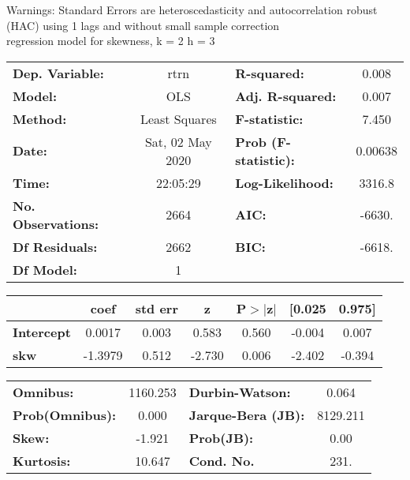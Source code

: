 Warnings: \newline
 [1] Standard Errors are heteroscedasticity and autocorrelation robust (HAC) using 1 lags and without small sample correction\\ 

regression model for skewness, k = 2 h = 3\begin{center}
\begin{tabular}{lclc}
\toprule
\textbf{Dep. Variable:}    &       rtrn       & \textbf{  R-squared:         } &     0.008   \\
\textbf{Model:}            &       OLS        & \textbf{  Adj. R-squared:    } &     0.007   \\
\textbf{Method:}           &  Least Squares   & \textbf{  F-statistic:       } &     7.450   \\
\textbf{Date:}             & Sat, 02 May 2020 & \textbf{  Prob (F-statistic):} &  0.00638    \\
\textbf{Time:}             &     22:05:29     & \textbf{  Log-Likelihood:    } &    3316.8   \\
\textbf{No. Observations:} &        2664      & \textbf{  AIC:               } &    -6630.   \\
\textbf{Df Residuals:}     &        2662      & \textbf{  BIC:               } &    -6618.   \\
\textbf{Df Model:}         &           1      & \textbf{                     } &             \\
\bottomrule
\end{tabular}
\begin{tabular}{lcccccc}
                   & \textbf{coef} & \textbf{std err} & \textbf{z} & \textbf{P$> |$z$|$} & \textbf{[0.025} & \textbf{0.975]}  \\
\midrule
\textbf{Intercept} &       0.0017  &        0.003     &     0.583  &         0.560        &       -0.004    &        0.007     \\
\textbf{skw}       &      -1.3979  &        0.512     &    -2.730  &         0.006        &       -2.402    &       -0.394     \\
\bottomrule
\end{tabular}
\begin{tabular}{lclc}
\textbf{Omnibus:}       & 1160.253 & \textbf{  Durbin-Watson:     } &    0.064  \\
\textbf{Prob(Omnibus):} &   0.000  & \textbf{  Jarque-Bera (JB):  } & 8129.211  \\
\textbf{Skew:}          &  -1.921  & \textbf{  Prob(JB):          } &     0.00  \\
\textbf{Kurtosis:}      &  10.647  & \textbf{  Cond. No.          } &     231.  \\
\bottomrule
\end{tabular}
\end{center}

